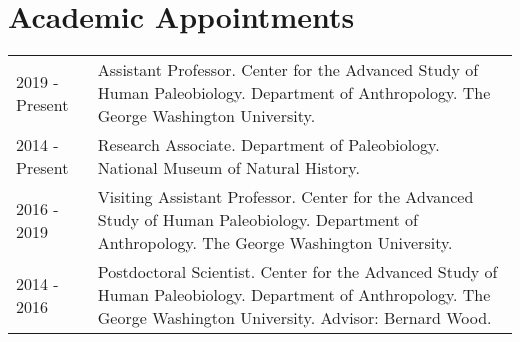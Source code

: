 \documentclass{article}
\begin{document}
\section*{Academic Appointments}
\begin{tabular}{p{}p{}}
2019 - Present & Assistant Professor. Center for the Advanced Study of Human Paleobiology. Department of Anthropology. The George Washington University.\\[4pt]
2014 - Present & Research Associate. Department of Paleobiology.  National Museum of Natural History.\\
2016 - 2019 & Visiting Assistant Professor. Center for the Advanced Study of Human Paleobiology. Department of Anthropology. The George Washington University.\\[4pt]
2014 - 2016 & Postdoctoral Scientist. Center for the Advanced Study of Human Paleobiology. Department of Anthropology. The George Washington University. Advisor: Bernard Wood.\\[4pt]
\end{tabular} 
\end{document}
